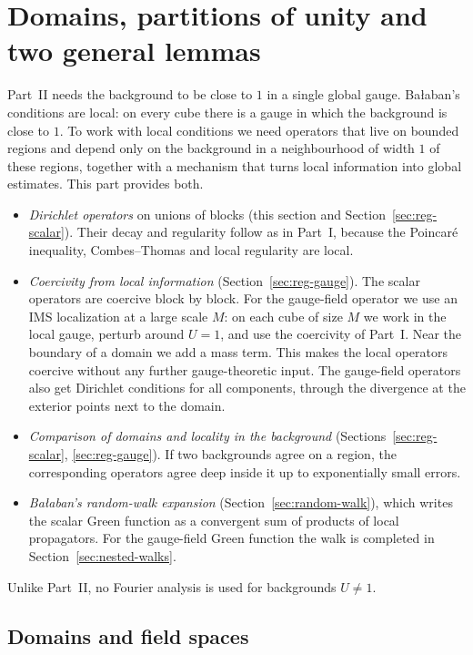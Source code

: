 \section{Domains, partitions of unity and two general lemmas}\label{sec:domains}

Part~II needs the background to be close to $1$ in a single global gauge. Ba\l aban's conditions are local: on every cube there is a gauge in which the background is close to $1$. To work with local conditions we need operators that live on bounded regions and depend only on the background in a neighbourhood of width $1$ of these regions, together with a mechanism that turns local information into global estimates. This part provides both.
\begin{itemize}
\item \emph{Dirichlet operators} on unions of blocks (this section and Section~\ref{sec:reg-scalar}). Their decay and regularity follow as in Part~I, because the Poincar\'e inequality, Combes--Thomas and local regularity are local.
\item \emph{Coercivity from local information} (Section~\ref{sec:reg-gauge}). The scalar operators are coercive block by block. For the gauge-field operator we use an IMS localization at a large scale $M$: on each cube of size $M$ we work in the local gauge, perturb around $U=1$, and use the coercivity of Part~I. Near the boundary of a domain we add a mass term. This makes the local operators coercive without any further gauge-theoretic input. The gauge-field operators also get Dirichlet conditions for all components, through the divergence at the exterior points next to the domain.
\item \emph{Comparison of domains and locality in the background} (Sections~\ref{sec:reg-scalar}, \ref{sec:reg-gauge}). If two backgrounds agree on a region, the corresponding operators agree deep inside it up to exponentially small errors.
\item \emph{Ba\l aban's random-walk expansion} (Section~\ref{sec:random-walk}), which writes the scalar Green function as a convergent sum of products of local propagators. For the gauge-field Green function the walk is completed in Section~\ref{sec:nested-walks}.
\end{itemize}
Unlike Part~II, no Fourier analysis is used for backgrounds $U\neq1$.

\subsection{Domains and field spaces}\label{ss:17.1}

